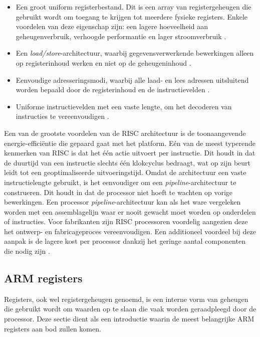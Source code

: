 \begin{itemize}
    \item Een groot uniform registerbestand. Dit is een array van registergeheugen die gebruikt wordt om toegang te krijgen tot meerdere fysieke registers. Enkele voordelen van deze eigenschap zijn: een lagere hoeveelheid aan geheugenverbruik, verhoogde performantie en lager stroomverbruik \autocite{Postiff2000}.
    \item Een \textit{load/store}-architectuur, waarbij gegevensverwerkende bewerkingen alleen op registerinhoud werken en niet op de geheugeninhoud \autocite{ARM2022a}.
    \item Eenvoudige adresseringsmodi, waarbij alle laad- en lees adressen uitsluitend worden bepaald door de registerinhoud en de instructievelden \autocite{Seal2000}.
    \item Uniforme instructievelden met een vaste lengte, om het decoderen van instructies te vereenvoudigen \autocite{ARM2022a}. 
\end{itemize}

Een van de grootste voordelen van de RISC architectuur is de toonaangevende energie-efficiëntie die gepaard gaat met het platform. Eén van de meest typerende kenmerken van RISC is dat het één actie uitvoert per instructie. Dit houdt in dat de duurtijd van een instructie slechts één klokcyclus bedraagt, wat op zijn beurt leidt tot een geoptimaliseerde uitvoeringstijd. Omdat de architectuur een vaste instructielengte gebruikt, is het eenvoudiger om een \textit{pipeline}-architectuur te construeren. Dit houdt in dat de processor niet hoeft te wachten op vorige bewerkingen. Een processor \textit{pipeline}-architectuur kan als het ware vergeleken worden met een assemblagelijn waar er nooit gewacht moet worden op onderdelen of instructies. Voor fabrikanten zijn RISC processoren voordelig aangezien deze het ontwerp- en fabricageproces vereenvoudigen. Een additioneel voordeel bij deze aanpak is de lagere kost per processor dankzij het geringe aantal componenten die nodig zijn \autocite{ARM2022}.

\subsection{ARM registers}
Registers, ook wel registergeheugen genoemd, is een interne vorm van geheugen die gebruikt wordt om waarden op te slaan die vaak worden geraadpleegd door de processor. Deze sectie dient als een introductie waarin de meest belangrijke ARM registers aan bod zullen komen.

